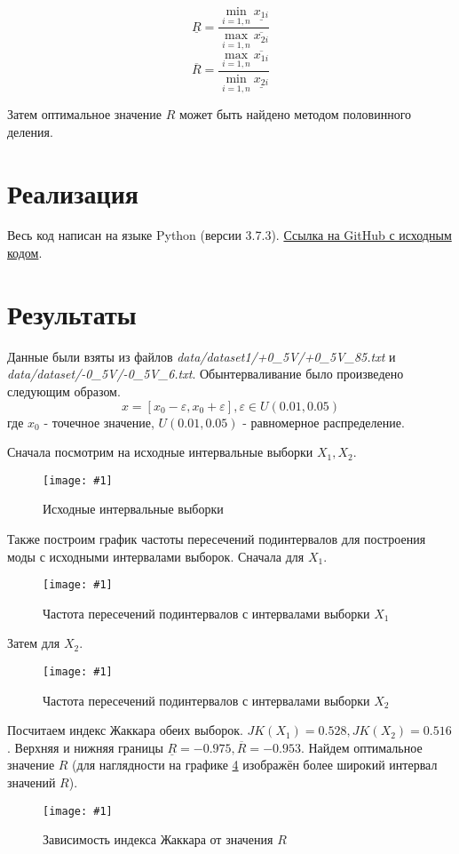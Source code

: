 \documentclass[a4paper,12pt]{article}
\newcommand{\plot}[3]{
    \begin{figure}[H]
        \begin{center}
            \texttt{[image: \#1]}
            \caption{#2}
            \label{#3}
        \end{center}
    \end{figure}
}
\begin{document}
    \begin{equation}
        \underline{R} = \frac{\min_{i=1,n}\underline{x_{1i}}}{\max_{i=1,n}\overline{x_{2i}}}
    \end{equation}
    \begin{equation}
        \overline{R} = \frac{\max_{i=1,n}\overline{x_{1i}}}{\min_{i=1,n}\underline{x_{2i}}}
    \end{equation}

    Затем оптимальное значение $ R $ может быть найдено методом половинного деления.

    \section{Реализация}
    \quad Весь код написан на языке Python (версии 3.7.3).
    \href{https://github.com/kirillkuks/Intervals/tree/master/lab1}{Ссылка на GitHub с исходным кодом}.

    \section{Результаты}
    \quad Данные были взяты из файлов \textsl{data/dataset1/+0\_5V/+0\_5V\_85.txt} и \textsl{data/dataset/-0\_5V/-0\_5V\_6.txt}.
    Обынтерваливание было произведено следующим образом.
    \begin{equation}
        x = [x_0 - \varepsilon, x_0 + \varepsilon], \varepsilon \in U(0.01, 0.05)
    \end{equation}
    где $ x_0 $ - точечное значение, $ U(0.01, 0.05) $ - равномерное распределение.
    
    Сначала посмотрим на исходные интервальные выборки $ X_1, X_2 $.
    \plot{_X1X2}{Исходные интервальные выборки}{p:x1x2}

    Также построим график частоты пересечений подинтервалов для построения моды с исходными интервалами выборок.
    Сначала для $ X_1 $.
    \plot{_ModaX1Hist}{Частота пересечений подинтервалов с интервалами выборки $ X_1 $}{p:modaX1}

    Затем для $ X_2 $.
    \plot{_ModaX2Hist}{Частота пересечений подинтервалов с интервалами выборки $ X_2 $}{p:modaX2}

    Посчитаем индекс Жаккара обеих выборок. $ JK(X_1) = 0.528, JK(X_2) = 0.516 $.
    Верхняя и нижняя границы $ \underline{R} = -0.975, \overline{R} = -0.953 $.
    Найдем оптимальное значение $ R $
    (для наглядности на графике \ref{p:jaccard} изображён более широкий интервал значений $ R $).
    \plot{_Jaccard}{Зависимость индекса Жаккара от значения $R$}{p:jaccard}
\end{document}

